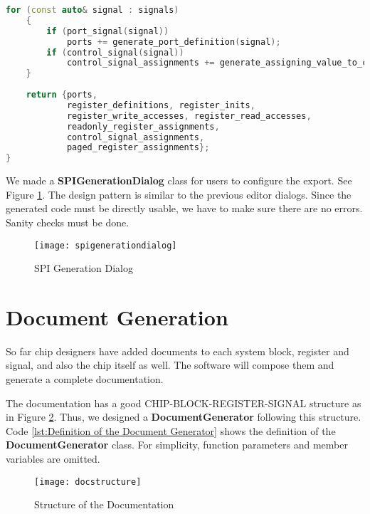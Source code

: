 \begin{lstlisting}[language=C++, caption={Logic of VHDL Interface Generation\label{lst:Logic of VHDL Interface Generation}}]
    for (const auto& signal : signals)
    {
        if (port_signal(signal)) 
            ports += generate_port_definition(signal);
        if (control_signal(signal)) 
            control_signal_assignments += generate_assigning_value_to_constrol_signal(signal);
    }
    
    return {ports,
            register_definitions, register_inits,
            register_write_accesses, register_read_accesses,
            readonly_register_assignments, 
            control_signal_assignments, 
            paged_register_assignments};
}
\end{lstlisting}

We made a \textbf{SPIGenerationDialog} class for users to configure the export. See Figure \ref{fig:SPI Generation Dialog}. The design pattern is similar to the previous editor dialogs. Since the generated code must be directly usable, we have to make sure there are no errors. Sanity checks must be done.

\begin{figure}[htb]
\centering
\texttt{[image: spigenerationdialog]}
\caption{SPI Generation Dialog\label{fig:SPI Generation Dialog}}
\end{figure} 

\section{Document Generation\label{sec:Document Generation}}
So far chip designers have added documents to each system block, register and signal, and also the chip itself as well. The software will compose them and generate a complete documentation.

The documentation has a good CHIP-BLOCK-REGISTER-SIGNAL structure as in Figure \ref{fig:Structure of the Documentation}. Thus, we designed a \textbf{DocumentGenerator} following this structure. Code \ref{lst:Definition of the Document Generator} shows the definition of the \textbf{DocumentGenerator} class. For simplicity, function parameters and member variables are omitted.

\begin{figure}[htb]
\centering
\texttt{[image: docstructure]}
\caption{Structure of the Documentation\label{fig:Structure of the Documentation}}
\end{figure} 

